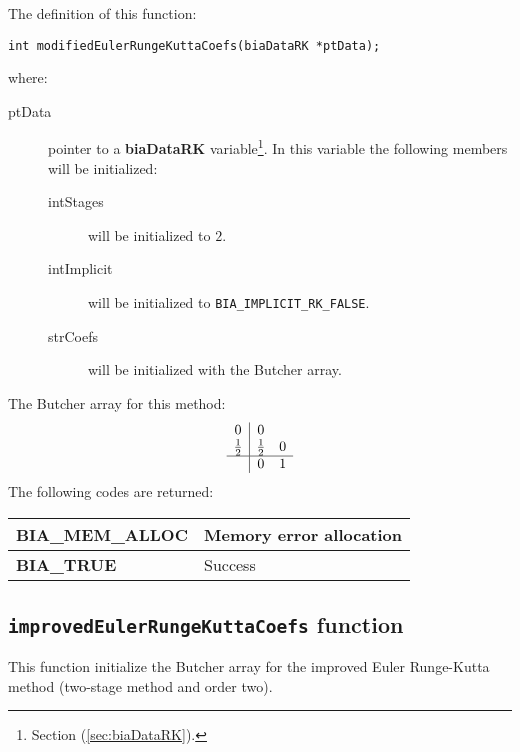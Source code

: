 The definition of this function:
%
\begin{verbatim}
int modifiedEulerRungeKuttaCoefs(biaDataRK *ptData);
\end{verbatim} 
%
where:
%
\begin{description}
\item[ptData] pointer to a \textbf{biaDataRK} variable\footnote{Section (\ref{sec:biaDataRK}).}. In this variable the following members will be initialized:
%
\begin{description}
%    
\item[intStages] will be initialized to $2$.
%  
\item[intImplicit] will be initialized to \texttt{BIA\_IMPLICIT\_RK\_FALSE}.
%
\item[strCoefs] will be initialized with the Butcher array.
%  
\end{description}
%  
\end{description}
%
The Butcher array for this method:
%
\begin{displaymath}
\begin{array}{c|cc}
0 & 0 \\
\frac{1}{2} & \frac{1}{2} & 0 \\
\hline
 & 0 & 1
\end{array}
\end{displaymath}
%
The following codes are returned:
%
\begin{center}
\begin{tabular}{|l|l|}
\hline
\textbf{BIA\_MEM\_ALLOC} & Memory error allocation \\
\hline
\textbf{BIA\_TRUE} & Success \\
\hline
\end{tabular}
\end{center}

\subsection{\texttt{improvedEulerRungeKuttaCoefs} function}

This function initialize the Butcher array for the improved Euler Runge-Kutta method (two-stage method and order two).\\

